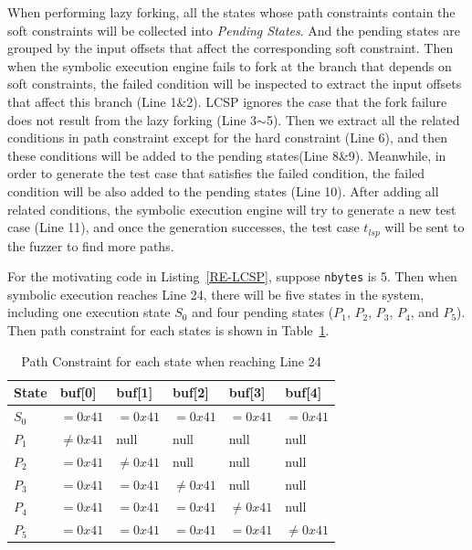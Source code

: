 When performing lazy forking, all the states whose path constraints contain the soft constraints will be collected into \emph{Pending States}. And the pending states are grouped by the input offsets that affect the corresponding soft constraint. 
Then when the symbolic execution engine fails to fork at the branch that depends on soft constraints, the failed condition will be inspected to extract the input offsets that affect this branch (Line 1\&2). LCSP ignores the case that the fork failure does not result from the lazy forking (Line 3$\sim$5). Then we extract all the related conditions in path constraint except for the hard constraint (Line 6), and then these conditions will be added to the pending states(Line 8\&9). Meanwhile, in order to generate the test case that satisfies the failed condition, the failed condition will be also added to the pending states (Line 10). After adding all related conditions, the symbolic execution engine will try to generate a new test case (Line 11), and once the generation successes, the test case $t_{lsp}$ will be sent to the fuzzer to find more paths.

For the motivating code in Listing~\ref{RE-LCSP}, suppose \texttt{nbytes} is 5. Then when symbolic execution reaches Line 24, there will be five states in the system, including one execution state $S_0$ and four pending states ($P_1$, $P_2$, $P_3$, $P_4$, and $P_5$). 
Then path constraint for each states is shown in Table~\ref{table:path-conditions}.

\begin{table}
  \caption{\label{table:path-conditions}Path Constraint for each state when reaching Line 24}
  \centering
	\begin{tabular}{p{2cm}<{\centering} p{1.5cm}<{\centering} p{1.5cm}<{\centering} p{1.5cm}<{\centering} p{1.5cm}<{\centering} p{1.5cm}<{\centering}}
		\toprule
		State  & buf[0] & buf[1] & buf[2] & buf[3] & buf[4]\\ 
		\midrule
		$S_0$  &  $=0x41$ & $=0x41$ & $=0x41$ & $=0x41$ & $=0x41$ \\
		$P_1$  &  $\neq0x41$ & null & null & null & null \\
		$P_2$  &  $=0x41$ & $\neq0x41$ & null & null & null\\
		$P_3$  &  $=0x41$ & $=0x41$ & $\neq0x41$ & null & null \\
		$P_4$  &  $=0x41$ & $=0x41$ & $=0x41$ & $\neq0x41$ & null \\
		$P_5$  &  $=0x41$ & $=0x41$ & $=0x41$ & $=0x41$ & $\neq0x41$ \\
		\bottomrule
	\end{tabular}
\end{table}

